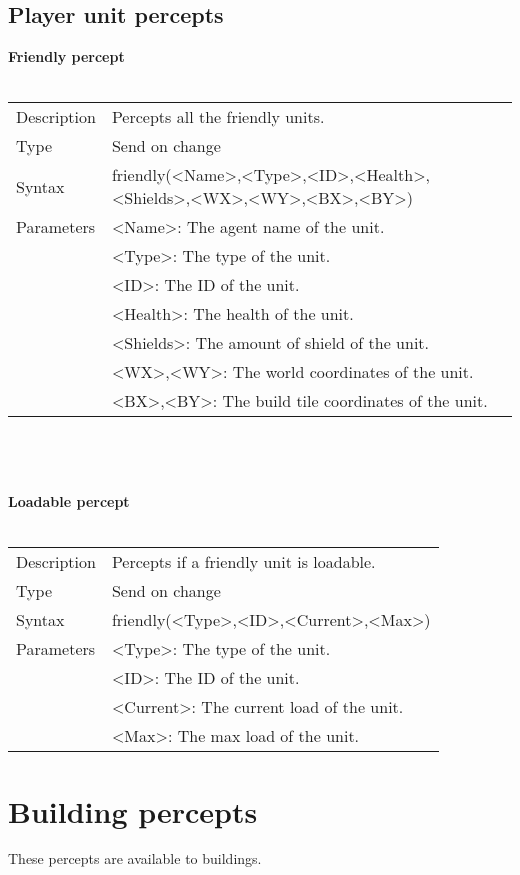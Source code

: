\documentclass[english,11pt]{report}
\begin{document}
\subsection{Player unit percepts}
\textbf{Friendly percept}\\
\\
\begin{tabularx}{\textwidth}{lX}
 Description & Percepts all the friendly units. \\
 Type & Send on change \\
 Syntax & friendly(<Name>,<Type>,<ID>,<Health>,<Shields>,<WX>,<WY>,<BX>,<BY>) \\
 Parameters &   <Name>: The agent name of the unit.\\
            &   <Type>: The type of the unit.\\
            &   <ID>: The ID of the unit.\\
            &   <Health>: The health of the unit.\\
            &   <Shields>: The amount of shield of the unit.\\
            &   <WX>,<WY>: The world coordinates of the unit.\\
            &   <BX>,<BY>: The build tile coordinates of the unit.
\end{tabularx}\\
\\
\\
\textbf{Loadable percept}\\
\\
\begin{tabularx}{\textwidth}{lX}
 Description & Percepts if a friendly unit is loadable. \\
 Type & Send on change \\
 Syntax & friendly(<Type>,<ID>,<Current>,<Max>) \\
 Parameters &   <Type>: The type of the unit.\\
            &   <ID>: The ID of the unit.\\
            &   <Current>: The current load of the unit.\\
            &   <Max>: The max load of the unit.
\end{tabularx}

\newpage
\section{Building percepts}
These percepts are available to buildings.
\end{document}
